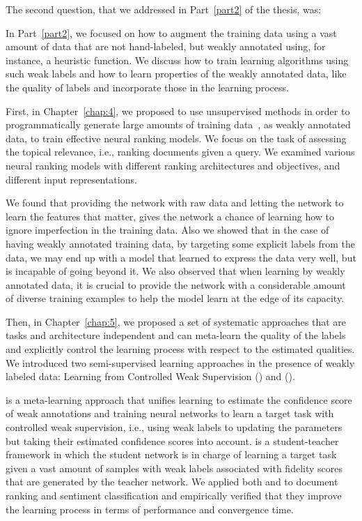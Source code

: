 \bigskip
The second question, that we addressed in Part~\ref{part2} of the thesis, was:
%

In Part~\ref{part2}, we focused on how to augment the training data using a vast amount of data that are not hand-labeled, but weakly annotated using, for instance, a heuristic function. We discuss how to train learning algorithms using such weak labels and how to learn properties of the weakly annotated data, like the quality of labels and incorporate those in the learning process.  

First, in Chapter~\ref{chap:4}, we proposed to use unsupervised methods in order to programmatically generate large amounts of training data~\citep{Ratner:2016}, as weakly annotated data, to train effective neural ranking models. We focus on the task of assessing the topical relevance, i.e., ranking documents given a query. We examined various neural ranking models with different ranking architectures and objectives, and different input representations.

We found that providing the network with raw data and letting the network to learn the features that matter, gives the network a chance of learning how to ignore imperfection in the training data. Also we showed that in the case of having weakly annotated training data, by targeting some explicit labels from the data, we may end up with a model that learned to express the data very well, but is incapable of going beyond it. We also observed that when learning by weakly annotated data, it is crucial to provide the network with a considerable amount of diverse training examples to help the model learn at the edge of its capacity.

Then, in Chapter~\ref{chap:5}, we proposed a set of systematic approaches that are tasks and architecture independent and can meta-learn the quality of the labels and explicitly control the learning process with respect to the estimated qualities. We introduced two semi-supervised learning approaches in the presence of weakly labeled data: Learning from Controlled Weak Supervision (\cws) and \fwlfulllc (\fwl).

\cws is a meta-learning approach that unifies learning to estimate the confidence score of weak annotations and training neural networks to learn a target task with controlled weak supervision, i.e., using weak labels to updating the parameters but taking their estimated confidence scores into account. \fwl is a student-teacher framework in which the student network is in charge of learning a target task given a vast amount of samples with weak labels associated with fidelity scores that are generated by the teacher network.  We applied both \cws and \fwl to document ranking and sentiment classification and empirically verified that they improve the learning process in terms of performance and convergence time. 

